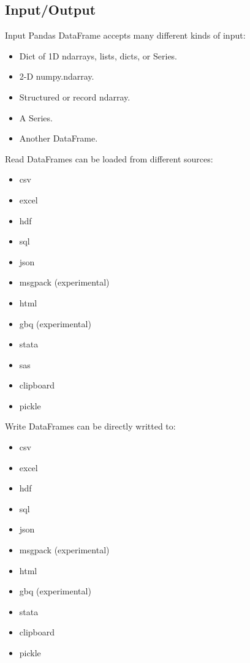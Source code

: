 \documentclass[final, 9pt, svgnames]{beamerPerdy}
\begin{document}
  \subsection{Input/Output}
  \begin{frame}{Input}
    Pandas DataFrame accepts many different kinds of input:
		\begin{itemize}
			\item Dict of 1D ndarrays, lists, dicts, or Series.
			\item 2-D numpy.ndarray.
			\item Structured or record ndarray.
			\item A Series.
			\item Another DataFrame.
		\end{itemize}
  \end{frame}
  \begin{frame}{Read}
		DataFrames can be loaded from different sources:
		\begin{itemize}
			\item csv
			\item excel
			\item hdf
			\item sql
			\item json
			\item msgpack (experimental)
			\item html
			\item gbq (experimental)
			\item stata
			\item sas
			\item clipboard
			\item pickle
		\end{itemize}
  \end{frame}
  \begin{frame}{Write}
		DataFrames can be directly writted to:
		\begin{itemize}
			\item csv
			\item excel
			\item hdf
			\item sql
			\item json
			\item msgpack (experimental)
			\item html
			\item gbq (experimental)
			\item stata
			\item clipboard
			\item pickle
		\end{itemize}
  \end{frame}
\end{document}
